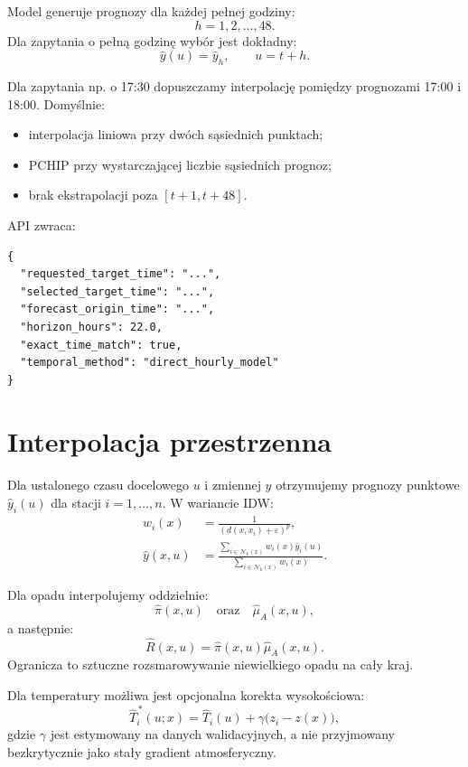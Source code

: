 \documentclass[11pt,a4paper,oneside]{article}
\begin{document}
Model generuje prognozy dla każdej pełnej godziny:
\[
  h=1,2,\ldots,48.
\]
Dla zapytania o pełną godzinę wybór jest dokładny:
\[
  \widehat y(u)=\widehat y_{h},\qquad u=t+h.
\]

Dla zapytania np. o 17:30 dopuszczamy interpolację pomiędzy prognozami
17:00 i 18:00. Domyślnie:
\begin{itemize}[nosep]
  \item interpolacja liniowa przy dwóch sąsiednich punktach;
  \item PCHIP przy wystarczającej liczbie sąsiednich prognoz;
  \item brak ekstrapolacji poza $[t+1,t+48]$.
\end{itemize}

API zwraca:
\begin{lstlisting}[style=code]
{
  "requested_target_time": "...",
  "selected_target_time": "...",
  "forecast_origin_time": "...",
  "horizon_hours": 22.0,
  "exact_time_match": true,
  "temporal_method": "direct_hourly_model"
}
\end{lstlisting}

\section{Interpolacja przestrzenna}

Dla ustalonego czasu docelowego $u$ i zmiennej $y$ otrzymujemy prognozy
punktowe $\widehat y_i(u)$ dla stacji $i=1,\ldots,n$. W wariancie IDW:
\begin{align}
  w_i(x) &= \frac{1}{(d(x,x_i)+\varepsilon)^p},\\
  \widehat y(x,u)
  &=
  \frac{\sum_{i\in\mathcal N_k(x)}w_i(x)\widehat y_i(u)}
       {\sum_{i\in\mathcal N_k(x)}w_i(x)}.
  \label{eq:idw}
\end{align}

Dla opadu interpolujemy oddzielnie:
\[
  \widehat\pi(x,u)
  \quad\text{oraz}\quad
  \widehat\mu_A(x,u),
\]
a następnie:
\[
  \widehat R(x,u)=\widehat\pi(x,u)\widehat\mu_A(x,u).
\]
Ogranicza to sztuczne rozsmarowywanie niewielkiego opadu na cały kraj.

Dla temperatury możliwa jest opcjonalna korekta wysokościowa:
\begin{equation}
  \widehat T^{\,*}_i(u;x)
  =
  \widehat T_i(u)+\gamma\bigl(z_i-z(x)\bigr),
\end{equation}
gdzie $\gamma$ jest estymowany na danych walidacyjnych, a nie przyjmowany
bezkrytycznie jako stały gradient atmosferyczny.
\end{document}
